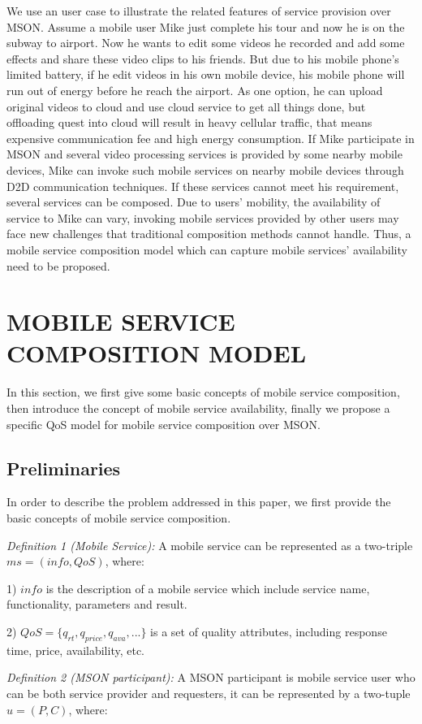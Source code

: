 \documentclass[10pt,journal,compsoc]{IEEEtran}
\begin{document}
We use an user case to illustrate the related features of service provision over MSON. Assume a mobile user Mike just complete his tour and now he is on the subway to airport. Now he wants to edit some videos he recorded and add some effects and share these video clips to his friends. But due to his mobile phone's limited battery, if he edit videos in his own mobile device, his mobile phone will run out of energy before he reach the airport. As one option, he can upload original videos to cloud and use cloud service to get all things done, but offloading quest into cloud will result in heavy cellular traffic, that means expensive communication fee and high energy consumption. If Mike participate in MSON and several video processing services is provided by some nearby mobile devices, Mike can invoke such mobile services on nearby mobile devices through D2D communication techniques. If these services cannot meet his requirement, several services can be composed. Due to users' mobility, the availability of service to Mike can vary, invoking mobile services provided by other users may face new challenges that traditional composition methods cannot handle. Thus, a mobile service composition model which can capture mobile services' availability need to be proposed.

\section{MOBILE SERVICE COMPOSITION MODEL}
In this section, we first give some basic concepts of mobile service composition, then introduce the concept of mobile service availability, finally we propose a specific QoS model for mobile service composition over MSON.
\subsection{Preliminaries}
In order to describe the problem addressed in this paper, we first provide the basic concepts of mobile service composition.

\textit{Definition 1 (Mobile Service):} A mobile service can be represented as a two-triple $ms = (info, QoS)$, where:

1) $info$ is the description of a mobile service which include service name, functionality, parameters and result.

​2) $QoS = \{ q_{rt}, q_{price}, q_{ava}, ... \}$ is a set of quality attributes, including response time, price, availability, etc.

\textit{Definition 2 (MSON participant):} A MSON participant is mobile service user who can be both service provider and requesters, it can be represented by a two-tuple $u = (P, C)$, where:
\end{document}
